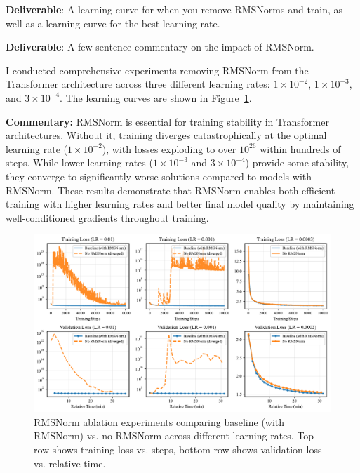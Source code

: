 \textbf{Deliverable}: A learning curve for when you remove RMSNorms and train, as well as a learning curve for the best learning rate.

\textbf{Deliverable}: A few sentence commentary on the impact of RMSNorm.

\begin{answer}

I conducted comprehensive experiments removing RMSNorm from the Transformer architecture across three different learning rates: $1 \times 10^{-2}$, $1 \times 10^{-3}$, and $3 \times 10^{-4}$. The learning curves are shown in Figure~\ref{fig:rmsnorm_ablation_experiments}.

\textbf{Commentary:} RMSNorm is essential for training stability in Transformer architectures. Without it, training diverges catastrophically at the optimal learning rate ($1 \times 10^{-2}$), with losses exploding to over $10^{26}$ within hundreds of steps. While lower learning rates ($1 \times 10^{-3}$ and $3 \times 10^{-4}$) provide some stability, they converge to significantly worse solutions compared to models with RMSNorm. These results demonstrate that RMSNorm enables both efficient training with higher learning rates and better final model quality by maintaining well-conditioned gradients throughout training.

\begin{figure}[!htb]
    \centering
    \includegraphics[width=\textwidth]{images/rmsnorm_ablation_experiments.pdf}
    \caption{RMSNorm ablation experiments comparing baseline (with RMSNorm) vs. no RMSNorm across different learning rates. Top row shows training loss vs. steps, bottom row shows validation loss vs. relative time.}
    \label{fig:rmsnorm_ablation_experiments}
\end{figure}

\end{answer}

